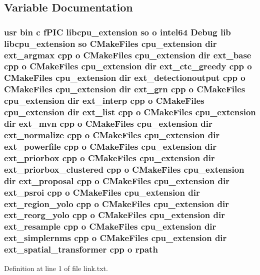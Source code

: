 \subsection{Variable Documentation}
\subsubsection[{\texorpdfstring{rpath}{rpath}}]{\setlength{\rightskip}{0pt plus 5cm}usr bin {\bf c} f\+P\+IC libcpu\+\_\+extension {\bf so} o intel64 Debug lib libcpu\+\_\+extension {\bf so} C\+Make\+Files {\bf cpu\+\_\+extension} dir ext\+\_\+argmax cpp o C\+Make\+Files {\bf cpu\+\_\+extension} dir ext\+\_\+base cpp o C\+Make\+Files {\bf cpu\+\_\+extension} dir ext\+\_\+ctc\+\_\+greedy cpp o C\+Make\+Files {\bf cpu\+\_\+extension} dir ext\+\_\+detectionoutput cpp o C\+Make\+Files {\bf cpu\+\_\+extension} dir ext\+\_\+grn cpp o C\+Make\+Files {\bf cpu\+\_\+extension} dir ext\+\_\+interp cpp o C\+Make\+Files {\bf cpu\+\_\+extension} dir ext\+\_\+list cpp o C\+Make\+Files {\bf cpu\+\_\+extension} dir ext\+\_\+mvn cpp o C\+Make\+Files {\bf cpu\+\_\+extension} dir ext\+\_\+normalize cpp o C\+Make\+Files {\bf cpu\+\_\+extension} dir ext\+\_\+powerfile cpp o C\+Make\+Files {\bf cpu\+\_\+extension} dir ext\+\_\+priorbox cpp o C\+Make\+Files {\bf cpu\+\_\+extension} dir ext\+\_\+priorbox\+\_\+clustered cpp o C\+Make\+Files {\bf cpu\+\_\+extension} dir ext\+\_\+proposal cpp o C\+Make\+Files {\bf cpu\+\_\+extension} dir ext\+\_\+psroi cpp o C\+Make\+Files {\bf cpu\+\_\+extension} dir ext\+\_\+region\+\_\+yolo cpp o C\+Make\+Files {\bf cpu\+\_\+extension} dir ext\+\_\+reorg\+\_\+yolo cpp o C\+Make\+Files {\bf cpu\+\_\+extension} dir ext\+\_\+resample cpp o C\+Make\+Files {\bf cpu\+\_\+extension} dir ext\+\_\+simplernms cpp o C\+Make\+Files {\bf cpu\+\_\+extension} dir ext\+\_\+spatial\+\_\+transformer cpp o rpath}\hypertarget{extension_2CMakeFiles_2cpu__extension_8dir_2link_8txt_a729b5a564f039d9c21d240895fd7d79d}{}\label{extension_2CMakeFiles_2cpu__extension_8dir_2link_8txt_a729b5a564f039d9c21d240895fd7d79d}


Definition at line 1 of file link.\+txt.

